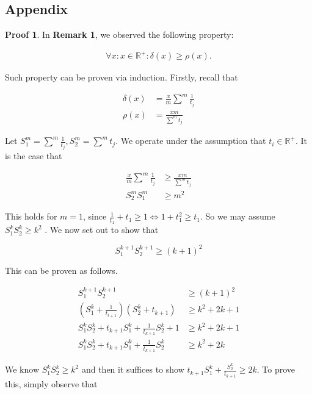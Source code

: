 \documentclass{article}
\begin{document}
\pagebreak

\begin{multicols}{2}

\section{Appendix}

\textbf{Proof 1}. In \textbf{Remark 1}, we observed the following property:

    \begin{align*}
        \forall x: x \in \mathbb{R}^+ : \delta(x) \geq \rho(x)
    .\end{align*}

Such property can be proven via induction. Firstly, recall that


\begin{align*} \delta(x) &= \frac{x}{m}\sum^m\frac{1}{t_j} \\
                \rho(x) &= \frac{xm}{\sum^m t_j} \end{align*}


Let $S_1^m = \sum^m\frac{1}{t_j}, S_2^m= \sum^m t_j$. We operate under the
assumption that $t_i \in \mathbb{R}^+$. It is the case that

\begin{align*} 
    \frac{x}{m}\sum^m\frac{1}{t_j} &\geq \frac{xm}{\sum^m t_j} \\ 
    S_2^mS_1^m &\geq m^2
\end{align*}

This holds for $m=1$, since $\frac{1}{t_1}+t_1 \geq 1 \iff 1+t_1^2 \geq t_1$. So
we may assume $S^k_1 S^k_2 \geq k^2$ . We now set out to show that

\begin{equation*} 
    S^{k+1}_1 S^{k+1}_2 \geq (k+1)^2
\end{equation*}

This can be proven as follows.

\begin{align*} 
    S^{k+1}_1 S^{k+1}_2 &\geq (k+1)^2 \\ 
    (S_1^k+\frac{1}{t_{t+1}})(S_2^k+t_{k+1}) &\geq k^2+2k+1 \\
    S^k_1S^k_2+ t_{k+1}S_1^k + \frac{1}{t_{k+1}}S^k_2+1 &\geq k^2+2k+1 \\
    S^k_1S^k_2+ t_{k+1}S_1^k + \frac{1}{t_{k+1}}S^k_2 &\geq k^2+2k 
\end{align*}

We know $S^k_1S^k_2 \geq k^2$ and then it suffices to show $t_{k+1}S_1^k +
\frac{S^k_2}{t_{k+1}}\geq 2k$. To prove this, simply observe that


\end{multicols}
\end{document}
